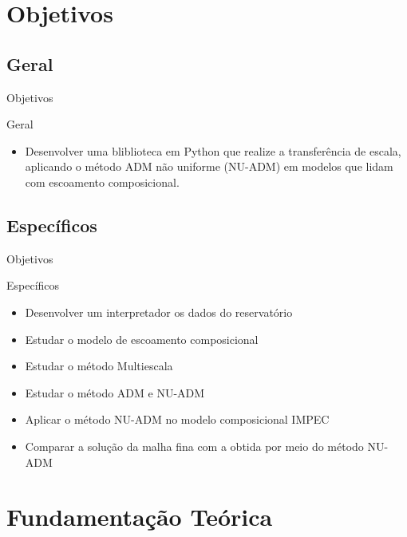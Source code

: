 \documentclass[professionalfont]{beamer}
\begin{document}
\section{Objetivos}

\subsection{Geral}
\begin{frame}{Objetivos}

    \begin{block}{Geral}
        \begin{itemize}
            \item Desenvolver uma bliblioteca em Python que realize a transferência de escala, aplicando o método ADM não uniforme (NU-ADM) em modelos que lidam com escoamento composicional.
        \end{itemize}
    \end{block}
    
\end{frame}

\subsection{Específicos}
\begin{frame}{Objetivos}
    
    \begin{block}{Específicos}
        \begin{itemize}
            \item Desenvolver um interpretador os dados do reservatório
            \item Estudar o modelo de escoamento composicional
            \item Estudar o método Multiescala
            \item Estudar o método ADM e NU-ADM
            \item Aplicar o método NU-ADM no modelo composicional IMPEC
            \item Comparar a solução da malha fina com a obtida por meio do método NU-ADM
        \end{itemize}
    \end{block}
    
\end{frame}

\section{Fundamentação Teórica}
\end{document}
